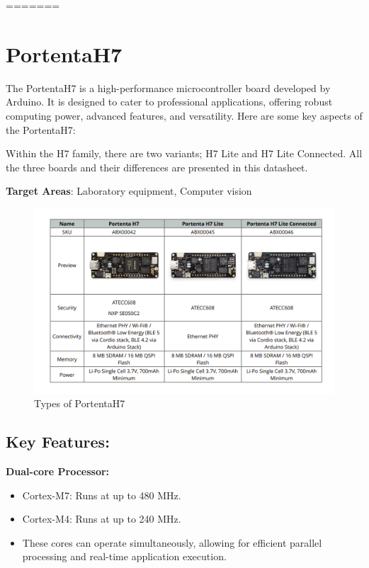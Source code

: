 		


	
=======
%
%

\chapter{PortentaH7}
	The PortentaH7 is a high-performance microcontroller board developed by Arduino. It is designed to cater to professional applications, offering robust computing power, advanced features, and versatility. Here are some key aspects of the PortentaH7:
	
	Within the H7 family, there are two variants; H7 Lite and H7 Lite Connected. All the three boards and their differences are presented in this datasheet.
	
	\textbf{Target Areas}: 
	Laboratory equipment, Computer vision
	
	\begin{figure}
		\begin{center}
			\includegraphics[width=0.7\linewidth]{Images/PortentaH7/TypesofPortentaH7.png}
			\caption{Types of PortentaH7}
			\label{Types}
		\end{center}
	\end{figure}
	
\section{Key Features:}

\textbf{Dual-core Processor:}

\begin{itemize}
	\item Cortex-M7: Runs at up to 480 MHz.
	\item Cortex-M4: Runs at up to 240 MHz.
	\item These cores can operate simultaneously, allowing for efficient parallel processing and real-time application execution.
\end{itemize}

